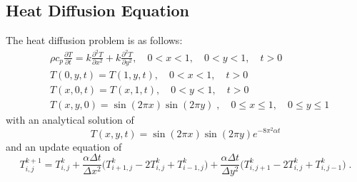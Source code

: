 \documentclass[mca,article,submit,moreauthors,pdftex]{Definitions/mdpi}
\begin{document}
\begin{paracol}{2}
\section{Heat Diffusion Equation}
\label{Heat-Diffusion}
The heat diffusion problem is as follows:
\begin{align*}
    &\rho c_p \frac{\partial T}{\partial t} = k\frac{\partial^2 T}{\partial x^2}+k\frac{\partial^2 T}{\partial y^2},\quad 0<x<1,\quad 0<y<1,\quad t>0\\
    &T(0,y,t) = T(1,y,t),\quad 0<x<1,\quad t>0\\
    &T(x,0,t) = T(x,1,t),\quad 0<y<1,\quad t>0\\
    &T(x,y,0) = \sin(2\pi x) \sin(2\pi y) \;, \quad 0\leq x\leq 1,\quad 0 \leq y \leq 1
\end{align*}
with an analytical solution of
\begin{equation*}
\label{heat-analyt}
    T(x,y,t) = \sin(2\pi x) \sin(2\pi y) e^{-8\pi^2\alpha t}
\end{equation*}
and an update equation of 
\begin{equation*}
    \label{heat-update}
    T_{i,j}^{k+1} = T_{i,j}^{k}+\frac{\alpha \Delta t}{\Delta x^2}\big(T_{i+1,j}^{k}-2T_{i,j}^{k}+T_{i-1,j}^{k}\big)+\frac{\alpha \Delta t}{\Delta y^2}\big(T_{i,j+1}^{k}-2T_{i,j}^{k}+T_{i,j-1}^{k}\big) \;.
\end{equation*}


\end{paracol}
\end{document}
